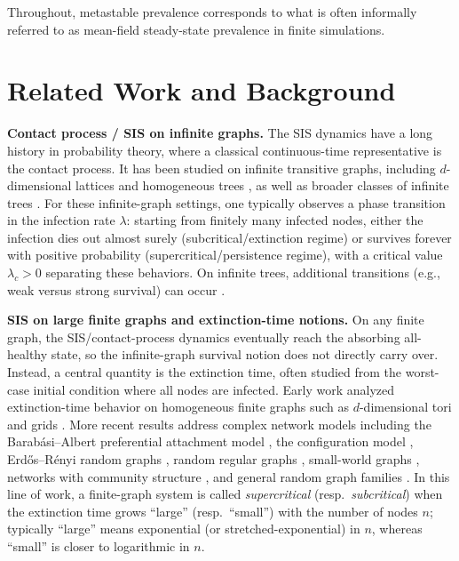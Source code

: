 \documentclass[pdflatex,sn-mathphys-num]{sn-jnl}%
\theoremstyle{thmstyleone}%
\theoremstyle{thmstyletwo}%
\theoremstyle{thmstylethree}%
\begin{document}
Throughout, metastable prevalence corresponds to what is often informally referred to as mean-field steady-state prevalence in finite simulations.


\section{Related Work and Background}
\label{sec:related}

\textbf{Contact process / SIS on infinite graphs.}
The SIS dynamics have a long history in probability theory, where a classical continuous-time representative is the contact process.
It has been studied on infinite transitive graphs, including $d$-dimensional lattices \cite{holley1978survival,durrett1982contact} and homogeneous trees \cite{liggett1996branching,lalley1999growth,lalley2002weak}, as well as broader classes of infinite trees \cite{pemantle1992contact}.
For these infinite-graph settings, one typically observes a phase transition in the infection rate $\lambda$: starting from finitely many infected nodes, either the infection dies out almost surely (subcritical/extinction regime) or survives forever with positive probability (supercritical/persistence regime), with a critical value $\lambda_c>0$ separating these behaviors.
On infinite trees, additional transitions (e.g., weak versus strong survival) can occur \cite{lalley2002weak,lalley1999growth}.

\textbf{SIS on large finite graphs and extinction-time notions.}
On any finite graph, the SIS/contact-process dynamics eventually reach the absorbing all-healthy state, so the infinite-graph survival notion does not directly carry over.
Instead, a central quantity is the extinction time, often studied from the worst-case initial condition where all nodes are infected.
Early work analyzed extinction-time behavior on homogeneous finite graphs such as $d$-dimensional tori and grids \cite{durrett1988contact,mountford1993metastable}.
More recent results address complex network models including the Barab\'asi--Albert preferential attachment model \cite{berger2005spread}, the configuration model \cite{ChatterjeeDurrett2009,Mountford2013,mountford2016exponential,bhamidi2021survival}, Erd\H{o}s--R\'enyi random graphs \cite{cator2021explicit,nam2022critical}, random regular graphs \cite{mourrat2016phase}, small-world graphs \cite{durrett2007two}, networks with community structure \cite{sivakoff2017contact-communities}, and general random graph families \cite{valesin2024contact}.
In this line of work, a finite-graph system is called \emph{supercritical} (resp.\ \emph{subcritical}) when the extinction time grows ``large'' (resp.\ ``small'') with the number of nodes $n$; typically ``large'' means exponential (or stretched-exponential) in $n$, whereas ``small'' is closer to logarithmic in $n$.
\end{document}

